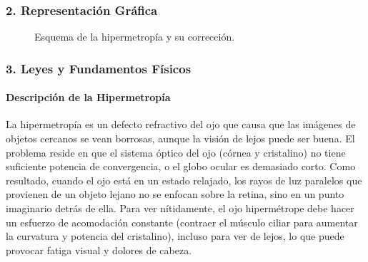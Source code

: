 \subsubsection*{2. Representación Gráfica}
\begin{figure}[H]
    \centering
    \hfill
    \caption{Esquema de la hipermetropía y su corrección.}
\end{figure}

\subsubsection*{3. Leyes y Fundamentos Físicos}
\paragraph*{Descripción de la Hipermetropía}
La hipermetropía es un defecto refractivo del ojo que causa que las imágenes de objetos cercanos se vean borrosas, aunque la visión de lejos puede ser buena. El problema reside en que el sistema óptico del ojo (córnea y cristalino) no tiene suficiente potencia de convergencia, o el globo ocular es demasiado corto. Como resultado, cuando el ojo está en un estado relajado, los rayos de luz paralelos que provienen de un objeto lejano no se enfocan sobre la retina, sino en un punto imaginario detrás de ella. Para ver nítidamente, el ojo hipermétrope debe hacer un esfuerzo de acomodación constante (contraer el músculo ciliar para aumentar la curvatura y potencia del cristalino), incluso para ver de lejos, lo que puede provocar fatiga visual y dolores de cabeza.

